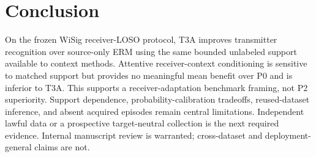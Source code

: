 \section{Conclusion}
On the frozen WiSig receiver-LOSO protocol, T3A improves transmitter recognition over source-only ERM using the same bounded unlabeled support available to context methods. Attentive receiver-context conditioning is sensitive to matched support but provides no meaningful mean benefit over P0 and is inferior to T3A. This supports a receiver-adaptation benchmark framing, not P2 superiority. Support dependence, probability-calibration tradeoffs, reused-dataset inference, and absent acquired episodes remain central limitations. Independent lawful data or a prospective target-neutral collection is the next required evidence. Internal manuscript review is warranted; cross-dataset and deployment-general claims are not.
